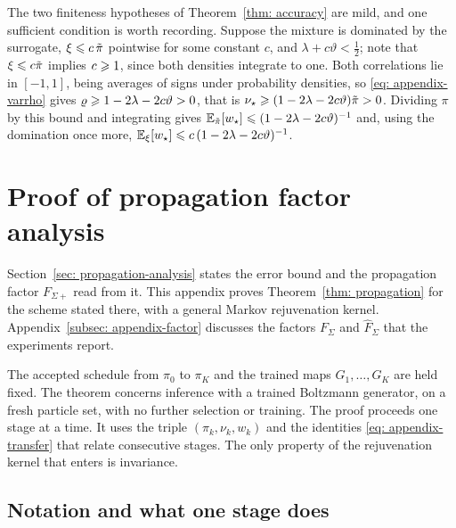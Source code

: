 \documentclass{article}
\begin{document}
\begin{remark}
\label{rem: appendix-domination}
The two finiteness hypotheses of Theorem~\ref{thm: accuracy} are mild, and one sufficient condition is worth recording. Suppose the mixture is dominated by the surrogate, $\xi\leqslant c\,\tilde\pi$ pointwise for some constant $c$, and $\lambda+c\vartheta<\tfrac12$; note that $\xi\leqslant c\tilde\pi$ implies $c\geqslant1$, since both densities integrate to one. Both correlations lie in $[-1,1]$, being averages of signs under probability densities, so \eqref{eq: appendix-varrho} gives $\varrho\geqslant1-2\lambda-2c\vartheta>0$, that is $\nu_\star\geqslant(1-2\lambda-2c\vartheta)\tilde\pi>0$. Dividing $\pi$ by this bound and integrating gives $\mathbb E_{\tilde\pi}[w_\star]\leqslant(1-2\lambda-2c\vartheta)^{-1}$ and, using the domination once more, $\mathbb E_{\xi}[w_\star]\leqslant c\,(1-2\lambda-2c\vartheta)^{-1}$.
\end{remark}


\section{\color{purple} Proof of propagation factor analysis}
\label{sec: appendix-propagation}

Section~\ref{sec: propagation-analysis} states the error bound and the propagation factor $F_{\Sigma+}$ read from it. This appendix proves Theorem~\ref{thm: propagation} for the scheme stated there, with a general Markov rejuvenation kernel. Appendix~\ref{subsec: appendix-factor} discusses the factors $F_{\Sigma}$ and $\hat F_{\Sigma}$ that the experiments report.

The accepted schedule from $\pi_0$ to $\pi_K$ and the trained maps $G_1,\dots,G_K$ are held fixed. The theorem concerns inference with a trained Boltzmann generator, on a fresh particle set, with no further selection or training. The proof proceeds one stage at a time. It uses the triple $(\pi_k,\nu_k,w_k)$ and the identities \eqref{eq: appendix-transfer} that relate consecutive stages. The only property of the rejuvenation kernel that enters is invariance.

\subsection{Notation and what one stage does}
\label{subsec: appendix-notation}
\end{document}
